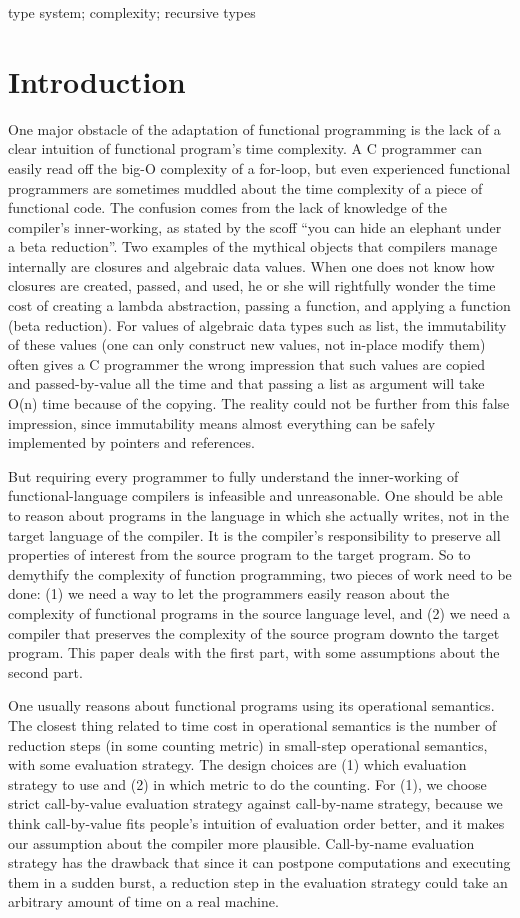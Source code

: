 \documentclass[preprint]{sigplanconf}
\begin{document}
\keywords
type system; complexity; recursive types

\section{Introduction}

One major obstacle of the adaptation of functional programming is the lack of a clear intuition of functional program's time complexity. A C programmer can easily read off the big-O complexity of a for-loop, but even experienced functional programmers are sometimes muddled about the time complexity of a piece of functional code. The confusion comes from the lack of knowledge of the compiler's inner-working, as stated by the scoff ``you can hide an elephant under a beta reduction''. Two examples of the mythical objects that compilers manage internally are closures and algebraic data values. When one does not know how closures are created, passed, and used, he or she will rightfully wonder the time cost of creating a lambda abstraction, passing a function, and applying a function (beta reduction). For values of algebraic data types such as list, the immutability of these values (one can only construct new values, not in-place modify them) often gives a C programmer the wrong impression that such values are copied and passed-by-value all the time and that passing a list as argument will take O(n) time because of the copying. The reality could not be further from this false impression, since immutability means almost everything can be safely implemented by pointers and references.

But requiring every programmer to fully understand the inner-working of functional-language compilers is infeasible and unreasonable. One should be able to reason about programs in the language in which she actually writes, not in the target language of the compiler. It is the compiler's responsibility to preserve all properties of interest from the source program to the target program. So to demythify the complexity of function programming, two pieces of work need to be done: (1) we need a way to let the programmers easily reason about the complexity of functional programs in the source language level, and (2) we need a compiler that preserves the complexity of the source program downto the target program. This paper deals with the first part, with some assumptions about the second part. 

One usually reasons about functional programs using its operational semantics. The closest thing related to time cost in operational semantics is the number of reduction steps (in some counting metric) in small-step operational semantics, with some evaluation strategy. The design choices are (1) which evaluation strategy to use and (2) in which metric to do the counting. For (1), we choose strict call-by-value evaluation strategy against call-by-name strategy, because we think call-by-value fits people's intuition of evaluation order better, and it makes our assumption about the compiler more plausible. Call-by-name evaluation strategy has the drawback that since it can postpone computations and executing them in a sudden burst, a reduction step in the evaluation strategy could take an arbitrary amount of time on a real machine.
\end{document}
